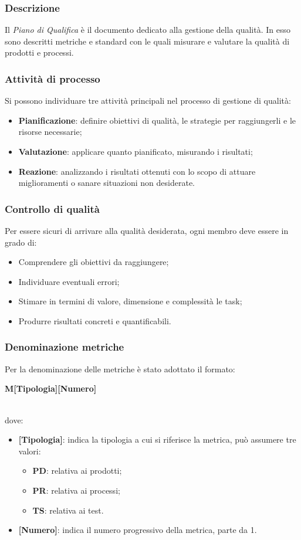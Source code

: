 \subsubsection{Descrizione}
Il \textit{Piano di Qualifica} è il documento dedicato alla gestione della qualità. In esso sono descritti metriche e standard con le quali misurare e valutare la qualità di prodotti e processi.  

\subsubsection{Attività di processo}
Si possono individuare tre attività principali nel processo di gestione di qualità:
\begin{itemize}
\item \textbf{Pianificazione}: definire obiettivi di qualità, le strategie per raggiungerli e le risorse necessarie; 
\item \textbf{Valutazione}: applicare quanto pianificato, misurando i risultati;
\item \textbf{Reazione}: analizzando i risultati ottenuti con lo scopo di attuare miglioramenti o sanare situazioni non desiderate.
\end{itemize}

\subsubsection{Controllo di qualità}
Per essere sicuri di arrivare alla qualità desiderata, ogni membro deve essere in grado di:
\begin{itemize}
\item Comprendere gli obiettivi da raggiungere;
\item Individuare eventuali errori;
\item Stimare in termini di valore, dimensione e complessità le task;
\item Produrre risultati concreti e quantificabili.
\end{itemize}

\subsubsection{Denominazione metriche}
Per la denominazione delle metriche è stato adottato il formato: \\
\centerline{\textbf{M[Tipologia][Numero]}} \\
dove:
\begin{itemize}
\item \textbf{[Tipologia]}: indica la tipologia a cui si riferisce la metrica, può assumere tre valori:
    \begin{itemize}
    \item \textbf{PD}: relativa ai prodotti; 
    \item \textbf{PR}: relativa ai processi;
    \item \textbf{TS}: relativa ai test.
    \end{itemize}
\item \textbf{[Numero]}: indica il numero progressivo della metrica, parte da 1.
\end{itemize}



